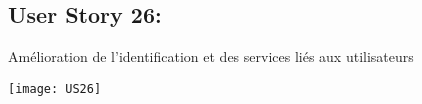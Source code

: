 \newpage{}
\subsection{User Story 26:}
Amélioration  de l'identification et des services liés aux utilisateurs


  \begin{center}
        \texttt{[image: US26]}
  \end{center}

